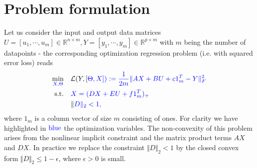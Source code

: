 \documentclass[letterpaper,10pt,english]{sphinxmanual}
\begin{document}
\section{Problem formulation}
\label{\detokenize{sections/bi_convex_formulation:problem-formulation}}
Let us consider the input and output data matrices \(U = [u_1, \cdots, u_m] \in \mathbb{R}^{n \times m},Y = [y_1, \cdots, y_m] \in \mathbb{R}^{p \times m}\)
with \(m\) being the number of datapoints - the corresponding optimization regression problem (i.e. with
squared error loss) reads
\begin{equation}\label{equation:sections/bi_convex_formulation:eq_2}
\begin{split}\begin{align}
    \min_{\color{blue}{X}, \color{blue}{\Theta}} \quad &\mathcal{L}(Y,[\color{blue}{\Theta},\color{blue}{X}]) := \frac{1}{2m} \Vert \color{blue}{AX} + \color{blue}{B}U + \color{blue}{c}1_m^T - Y \Vert_F^2 \\
    \text{s.t.} \quad &\color{blue}{X}=(\color{blue}{DX} + \color{blue}{E}U + \color{blue}{f}1_m^T)_+ \\
                \quad &\Vert \color{blue}{D} \Vert_2 < 1,
\end{align}\end{split}
\end{equation}
where \(1_m\) is a column vector of size \(m\) consisting of ones. For clarity we have highlighted in \(\color{blue}{\text{blue}}\) the optimization variables.
The non-convexity of this problem arises from the nonlinear implicit constraint and
the matrix product terms \(AX\) and \(DX\). In practice we replace the constraint \(\Vert D \Vert_2 < 1\)
by the closed convex form \(\Vert D \Vert_2 \leq 1 - \epsilon\), where \(\epsilon > 0\) is small.
\end{document}
